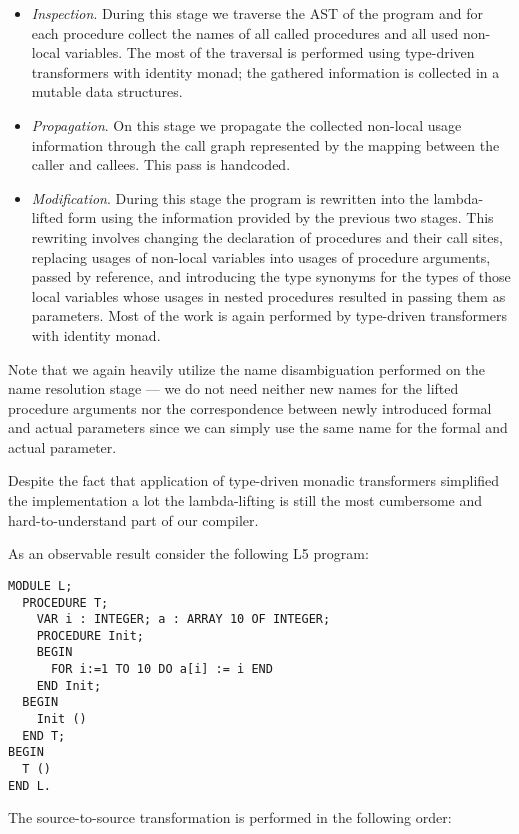 \begin{itemize}
\item \emph{Inspection}. During this stage we traverse the AST of the program and for each procedure collect the 
names of all called procedures and all used non-local variables. The most of the 
traversal is performed using type-driven transformers with identity monad; the gathered information is 
collected in a mutable data structures. 

\item \emph{Propagation}. On this stage we propagate the collected non-local usage information through the call
graph represented by the mapping between the caller and callees. This pass is handcoded.

\item \emph{Modification}. During this stage the program is rewritten into the lambda-lifted form using the information
provided by the previous two stages. This rewriting involves changing the declaration of procedures and
their call sites, replacing usages of non-local variables into usages of procedure arguments, passed by 
reference, and introducing the type synonyms for the types of those local variables whose usages in 
nested procedures resulted in passing them as parameters. Most of the work is again performed by
type-driven transformers with identity monad.
\end{itemize}

Note that we again heavily utilize the name disambiguation performed on the name resolution stage --- we do
not need neither new names for the lifted procedure arguments nor the correspondence between newly introduced
formal and actual parameters since we can simply use the same name for the formal and actual parameter.

Despite the fact that application of type-driven monadic transformers simplified the implementation a lot the
lambda-lifting is still the most cumbersome and hard-to-understand part of our compiler.

As an observable result consider the following L5 program:

\begin{lstlisting}[language=oberon0]
MODULE L;
  PROCEDURE T;
    VAR i : INTEGER; a : ARRAY 10 OF INTEGER;
    PROCEDURE Init;
    BEGIN
      FOR i:=1 TO 10 DO a[i] := i END
    END Init;
  BEGIN
    Init ()  
  END T;
BEGIN
  T ()
END L.
\end{lstlisting}

The source-to-source transformation is performed in the following order:

